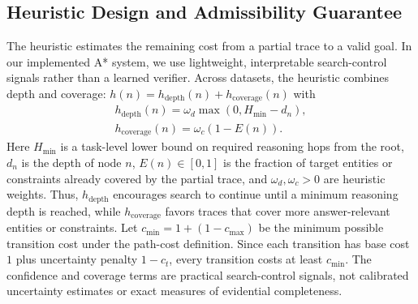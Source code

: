 \documentclass[11pt]{article}
\begin{document}






\subsection{Heuristic Design and Admissibility Guarantee}
\label{sec:heuristic_design}

The heuristic estimates the remaining cost from a partial trace to a valid goal. In our implemented A* system, we use lightweight, interpretable search-control signals rather than a learned verifier. Across datasets, the heuristic combines depth and coverage: $h(n)=h_{\mathrm{depth}}(n)+h_{\mathrm{coverage}}(n)$ with
\begin{multline}
h_{\mathrm{depth}}(n)=\omega_d\max(0,H_{\min}-d_n),
\\
h_{\mathrm{coverage}}(n)=\omega_c(1-E(n)).
\end{multline}
Here \(H_{\min}\) is a task-level lower bound on required reasoning hops from the root, \(d_n\) is the depth of node \(n\), \(E(n)\in[0,1]\) is the fraction of target entities or constraints already covered by the partial trace, and \(\omega_d,\omega_c>0\) are heuristic weights. Thus, \(h_{\mathrm{depth}}\) encourages search to continue until a minimum reasoning depth is reached, while \(h_{\mathrm{coverage}}\) favors traces that cover more answer-relevant entities or constraints. Let $c_{\min}=1+(1-c_{\max})$ be the minimum possible transition cost under the path-cost definition. Since each transition has base cost \(1\) plus uncertainty penalty \(1-c_t\), every transition costs at least \(c_{\min}\). The confidence and coverage terms are practical search-control signals, not calibrated uncertainty estimates or exact measures of evidential completeness.
\end{document}
